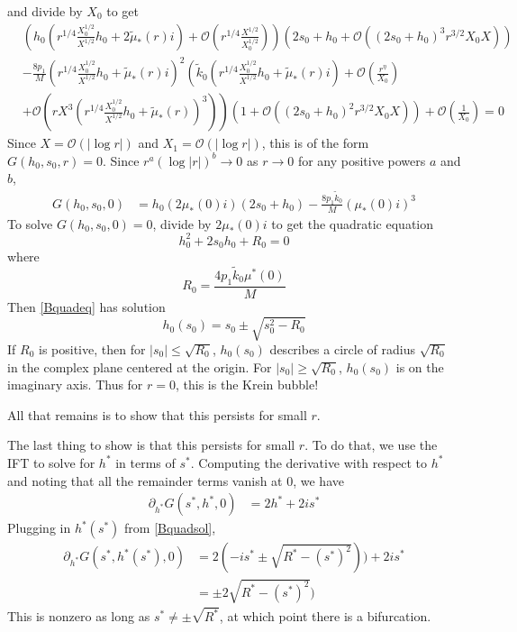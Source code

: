 \documentclass[thesis.tex]{subfiles}
\begin{document}
and divide by $X_0$ to get
\begin{equation*}
\begin{aligned}
&\left( h_0 \left( r^{1/4}\frac{X_0^{1/2}}{X^{1/2}} h_0 + 2 \tilde{\mu}_*(r) i\right) + \mathcal{O}\left( r^{1/4} \frac{X^{1/2}}{X_0^{1/2}} \right) \right) 
\left( 2 s_0 + h_0 + \mathcal{O}\left( \left( 2 s_0 + h_0 \right)^3 r^{3/2} X_0 X \right) \right) \\
&-\frac{8 p_1}{M} \left( r^{1/4}\frac{X_0^{1/2}}{X^{1/2}} h_0 + \tilde{\mu}_*(r) i\right)^2 \left( \tilde{k}_0 \left(r^{1/4}\frac{X_0^{1/2}}{X^{1/2}} h_0 + \tilde{\mu}_*(r)i \right) + \mathcal{O}\left(\frac{r^{\eta}}{X_0} \right) \right.\\
&+ \left. \mathcal{O} \left (r X^3 \left(r^{1/4} \frac{X_0^{1/2}}{X^{1/2}} h_0 + \tilde{\mu}_*(r)\right)^3 \right) \right) \left( 1 + \mathcal{O}\left( \left(2 s_0 + h_0\right)^2 r^{3/2} X_0 X \right) \right) + \mathcal{O}\left(\frac{1}{X_0}\right) = 0
\end{aligned}
\end{equation*}
Since $X = \mathcal{O}(|\log r|)$ and $X_1 = \mathcal{O}(|\log r|)$, this is of the form $G(h_0, s_0, r) = 0$. Since $r^{a}(\log|r|)^b \rightarrow 0$ as $r \rightarrow 0$ for any positive powers $a$ and $b$, 
\begin{equation}\label{BsimpleG0}
\begin{aligned}
G(h_0, s_0, 0) &= h_0 (2 \mu_*(0) i)(2 s_0 + h_0) - \frac{8 p_1 \tilde{k}_0}{M}(\mu_*(0) i)^3 
\end{aligned}
\end{equation}
To solve $G(h_0, s_0, 0) = 0$, divide by $2 \mu_*(0) i$ to get the quadratic equation
\begin{equation}\label{Bquadeq1}
h_0^2 + 2 s_0 h_0 + R_0 = 0
\end{equation}
where 
\[
R_0 = \frac{4 p_1 \tilde{k}_0 \mu^*(0)}{M}
\]
Then \cref{Bquadeq} has solution
\begin{equation}\label{Bquadsol}
h_0(s_0) = s_0 \pm \sqrt{ s_0^2 - R_0 }
\end{equation}
If $R_0$ is positive, then for $|s_0| \leq \sqrt{R_0}$, $h_0(s_0)$ describes a circle of radius $\sqrt{R_0}$ in the complex plane centered at the origin. For $|s_0| \geq \sqrt{R_0}$, $h_0(s_0)$ is on the imaginary axis. Thus for $r = 0$, this is the Krein bubble!

All that remains is to show that this persists for small $r$. 

The last thing to show is that this persists for small $r$. To do that, we use the IFT to solve for $h^*$ in terms of $s^*$. Computing the derivative with respect to $h^*$ and noting that all the remainder terms vanish at 0, we have
\begin{align*}
\partial_{h^*} G(s^*, h^*, 0) 
&= 2 h^* + 2 i s^*
\end{align*}
Plugging in $h^*(s^*)$ from \cref{Bquadsol},
\begin{align*}
\partial_{h^*} G(s^*, h^*(s^*), 0) 
&= 2 (-i s^* \pm \sqrt{R^* - (s^*)^2 })) + 2 i s^* \\
&= \pm 2 \sqrt{R^* - (s^*)^2 })
\end{align*}
This is nonzero as long as $s^* \neq \pm \sqrt{R^*}$, at which point there is a bifurcation. 
\end{document}
